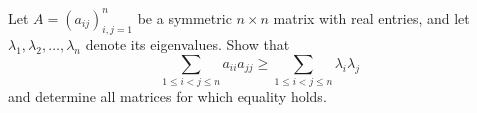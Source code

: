 Let \(A=(a_{ij})_{i, j=1}^n\) be a symmetric \(n\times n\) matrix with real entries, and let \(\lambda _1, \lambda _2, \dots, \lambda _n\) denote its eigenvalues. Show that
\[\sum_{1\le i<j\le n} a_{ii}a_{jj}\ge \sum_{1\le i < j\le n} \lambda _i \lambda _j\]and determine all matrices for which equality holds.